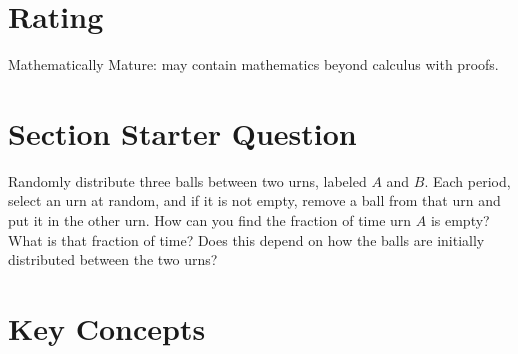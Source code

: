 \documentclass[12pt]{article}
\begin{document}
\myheader \mytitle

\hr


\hr

\usefirefox



\hr

\section*{Rating} %
Mathematically Mature:  may contain mathematics beyond calculus with
proofs.  %

\hr

\section*{Section Starter Question}

Randomly distribute three balls between two urns, labeled \( A \) and \(
B \).  Each period, select an urn at random, and if it is not empty,
remove a ball from that urn and put it in the other urn.  How can you
find the fraction of time urn \( A \) is empty?  What is that fraction
of time?  Does this depend on how the balls are initially distributed
between the two urns?

\hr

\section*{Key Concepts}
\end{document}
